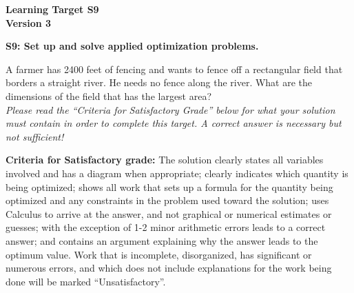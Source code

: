 \documentclass[10pt]{article}
\begin{document}
	\vspace*{0in}

		\begin{center}
			\textbf{Learning Target S9 \\
			Version 3} 
		\end{center}


\begin{framed}
	\textbf{S9: Set up and solve applied optimization problems.}
\end{framed}

A farmer has 2400 feet of fencing and wants to fence off a rectangular field that borders a straight river. He needs no fence along the river. What are the dimensions of the field that has the largest area?  \\

\emph{Please read the ``Criteria for Satisfactory Grade'' below for what your solution must contain in order to complete this target. A correct answer is necessary but not sufficient!} 




\vfill

\begin{small}
    \begin{framed}
        	\textbf{Criteria for Satisfactory grade:} The solution clearly states all variables involved and has a diagram when appropriate; clearly indicates which quantity is being optimized; shows all work that sets up a formula for the quantity being optimized and any constraints in the problem used toward the solution; uses Calculus to arrive at the answer, and not graphical or numerical estimates or guesses; with the exception of 1-2 minor arithmetic errors leads to a correct answer; and contains an argument explaining why the answer leads to the optimum value. Work that is incomplete, disorganized, has significant or numerous errors, and which does not include explanations for the work being done will be marked ``Unsatisfactory''. 
    \end{framed}

\end{small}
\end{document}

